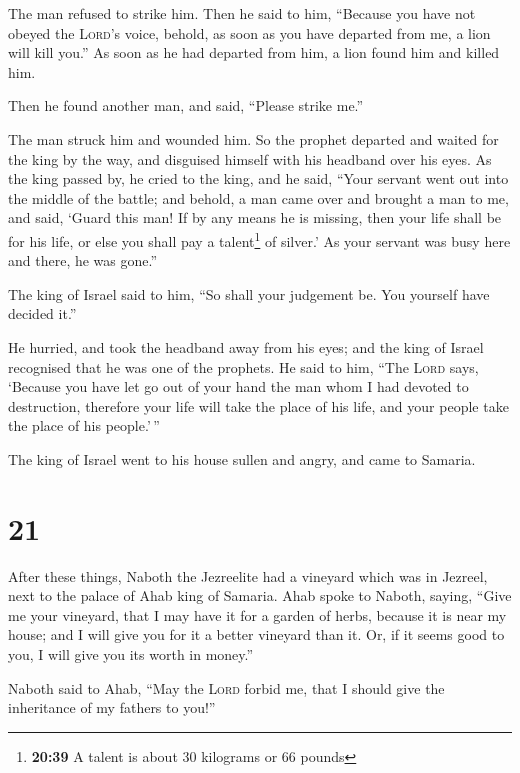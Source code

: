 The man refused to strike him.  Then he said to him,
``Because you have not obeyed the \textsc{Lord}'s voice, behold, as soon
as you have departed from me, a lion will kill you.'' As soon as he had
departed from him, a lion found him and killed him.

 Then he found another man, and said, ``Please strike
me.''

The man struck him and wounded him.  So the prophet
departed and waited for the king by the way, and disguised himself with
his headband over his eyes.  As the king passed by, he
cried to the king, and he said, ``Your servant went out into the middle
of the battle; and behold, a man came over and brought a man to me, and
said, `Guard this man! If by any means he is missing, then your life
shall be for his life, or else you shall pay a talent\footnote{\textbf{20:39}
  A talent is about 30 kilograms or 66 pounds} of silver.'
 As your servant was busy here and there, he was gone.''

The king of Israel said to him, ``So shall your judgement be. You
yourself have decided it.''

 He hurried, and took the headband away from his eyes;
and the king of Israel recognised that he was one of the prophets.
 He said to him, ``The \textsc{Lord} says, `Because you
have let go out of your hand the man whom I had devoted to destruction,
therefore your life will take the place of his life, and your people
take the place of his people.'\,''

 The king of Israel went to his house sullen and angry,
and came to Samaria.

\hypertarget{section-20}{%
\section{21}\label{section-20}}

 After these things, Naboth the Jezreelite had a vineyard
which was in Jezreel, next to the palace of Ahab king of Samaria.
 Ahab spoke to Naboth, saying, ``Give me your vineyard,
that I may have it for a garden of herbs, because it is near my house;
and I will give you for it a better vineyard than it. Or, if it seems
good to you, I will give you its worth in money.''

 Naboth said to Ahab, ``May the \textsc{Lord} forbid me,
that I should give the inheritance of my fathers to you!''

